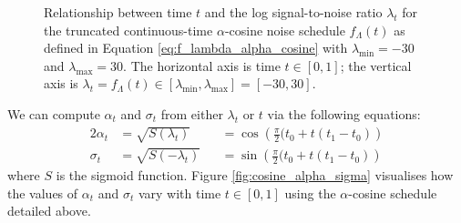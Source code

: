 \documentclass[ oneside,%
                    author={George Herbert},
                    degree={MSci},
                     title={Diffusion Models for Time-Evolving Precipitation Fields},
                  subtitle={}]{dissertation}
\begin{document}
\begin{figure}[htbp]
      \centering
      \caption{Relationship between time $t$ and the log signal-to-noise ratio $\lambda_t$ for the truncated continuous-time $\alpha$-cosine noise schedule $f_\Lambda(t)$ as defined in Equation \ref{eq:f_lambda_alpha_cosine} with $\lambda_{\min}=-30$ and $\lambda_{\max}=30$. The horizontal axis is time $t\in[0,1]$; the vertical axis is $\lambda_t=f_\Lambda(t)\in[\lambda_{\min},\lambda_{\max}]=[-30, 30]$.}
      \label{fig:cosine_lambda_t}
\end{figure}
We can compute $\alpha_t$ and $\sigma_t$ from either $\lambda_t$ or $t$ via the following equations:
\begin{alignat}{2}
      \alpha_t&=\sqrt{S(\lambda_t)}&&=\cos\left(\frac{\pi}{2}(t_0+t(t_1-t_0)\right)\label{eq:alpha_t_alpha_cosine}\\
      \sigma_t&=\sqrt{S(-\lambda_t)}&&=\sin\left(\frac{\pi}{2}(t_0+t(t_1-t_0)\right)\label{eq:sigma_t_alpha_cosine}
\end{alignat}
where $S$ is the sigmoid function. Figure \ref{fig:cosine_alpha_sigma} visualises how the values of $\alpha_t$ and $\sigma_t$ vary with time $t\in[0,1]$ using the $\alpha$-cosine schedule detailed above.
\end{document}
